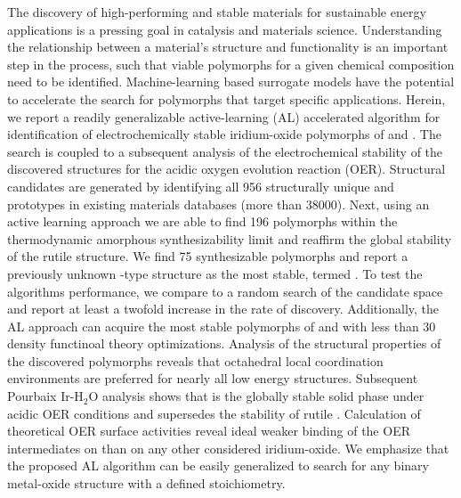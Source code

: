 %



\noindent The discovery of high-performing and stable materials for sustainable energy applications is a pressing goal in catalysis and materials science.
%
Understanding the relationship between a material's structure and functionality is an important step in the process, such that viable polymorphs for a given chemical composition need to be identified.
%
Machine-learning based surrogate models have the potential to accelerate the search for polymorphs that target specific applications.
%
Herein, we report a readily generalizable active-learning (AL) accelerated algorithm for identification of electrochemically stable iridium-oxide polymorphs of \IrOtwo and \IrOthree.
%
The search is coupled to a subsequent analysis of the electrochemical stability of the discovered structures for the acidic oxygen evolution reaction (OER).
%
Structural candidates are generated by identifying all \num{956} structurally unique \ABtwo and \ABthree prototypes in existing materials databases (more than \num{38000}).
%
Next, using an active learning approach we are able to find \num{196} \IrOtwo polymorphs within the thermodynamic amorphous synthesizability limit and reaffirm the global stability of the rutile structure.
%
We find \num{75} synthesizable \IrOthree polymorphs and report a previously unknown -type structure as the most stable, termed \aIrOthree.
%
To test the algorithms performance,
we compare to a random search of the candidate space and report at least a twofold increase in the rate of discovery.
%
Additionally, the AL approach can acquire the most stable polymorphs of \IrOtwo and \IrOthree with less than \num{30} density functinoal theory optimizations.
%
Analysis of the structural properties of the discovered polymorphs reveals that octahedral local coordination environments are preferred for nearly all low energy structures.
%
Subsequent Pourbaix Ir-H$_2$O analysis shows that \aIrOthree is the globally stable solid phase under acidic OER conditions and supersedes the stability of rutile \IrOtwo.
%
Calculation of theoretical OER surface activities reveal ideal weaker binding of the OER intermediates on \aIrOthree than on any other considered iridium-oxide.
%
We emphasize that the proposed AL algorithm can be easily generalized to search for any binary metal-oxide structure with a defined stoichiometry.

